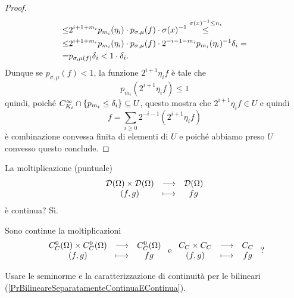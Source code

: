 \begin{proof}
\begin{align*}
    \leq&2^{i+1+m_i}p_{m_i}(\eta_i)\cdot p_{\sigma,\mu}(f)\cdot \sigma(x)^{-1}\overset{\sigma(x)^{-1}\leq n_i}{\leq}\\
    \leq&2^{i+1+m_i}p_{m_i}(\eta_i)\cdot p_{\sigma,\mu}(f)\cdot2^{-i-1-m_i}p_{m_i}(\eta_i)^{-1}\delta_i=\\
    =&p_{\sigma,\mu(f)}\delta_i<1\cdot \delta_i.
\end{align*}
Dunque se $p_{\sigma,\mu}(f)<1$, la funzione $2^{i+1}\eta_i f$ \`e tale che
\[p_{m_i}(2^{i+1}\eta_i f)\leq 1\]
quindi, poich\'e $C^\infty_{K_i}\cap\left\{{p_{m_i}\leq \delta_i}\right\}\subseteq U$, questo mostra che $2^{i+1}\eta_i f\in U$ e quindi
\[f=\sum_{i\geq 0}2^{-i-1}(2^{i+1}\eta_i f)\]
\`e combinazione convessa finita di elementi di $U$ e poich\'e abbiamo preso $U$ convesso questo conclude.
\end{proof}

\begin{exercise}
La moltiplicazione (puntuale)
\[\begin{array}{ccc} {\mathcal{D}(\Omega)\times\mathcal{D}(\Omega)} & \longrightarrow & {\mathcal{D}(\Omega)}\\ {(f,g)} & \longmapsto & {fg} \end{array}\]
\`e continua? S\`i.

Sono continue la moltiplicazioni
\[\begin{array}{ccc} {C^0_C(\Omega)\times C^0_C(\Omega)} & \longrightarrow & {C^0_C(\Omega)}\\ {(f,g)} & \longmapsto & {fg} \end{array}\text{ e }\begin{array}{ccc} {C_C\times C_C} & \longrightarrow & {C_C}\\ {(f,g)} & \longmapsto & {fg} \end{array}\text{ ?}\]
\end{exercise}
\begin{solution}
Usare le seminorme e la caratterizzazione di continuit\`a per le bilineari (\ref{PrBilineareSeparatamenteContinuaEContinua}).
\end{solution}


